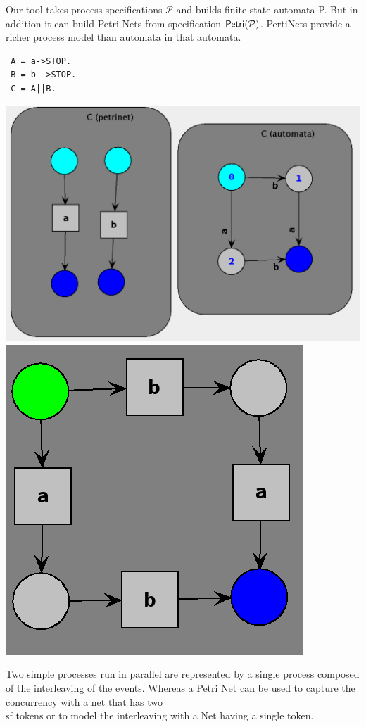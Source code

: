 \documentclass[]{article}
\begin{document}
Our tool takes process specifications $\mathcal{P}$ and builds finite state automata {\sf P}. But in addition it can build Petri Nets from specification ${\sf Petri(\mathcal{P})}$.  PertiNets provide a richer process model than automata in that automata.
\begin{center}\begin{minipage}{0.2\textwidth}
\begin{verbatim}
 A = a->STOP.
 B = b ->STOP.
 C = A||B.
   \end{verbatim}
\end{minipage}\begin{minipage}{0.75\textwidth}
\begin{center}\includegraphics[scale=0.375]{NetsAB.png}
\includegraphics[scale=0.4]{NetInt.png}\end{center}
\end{minipage}
\end{center}
Two simple processes run in parallel are represented by a single process composed of the interleaving of the events. Whereas a Petri Net can be used to capture the concurrency  with a net that has two {\\sf tokens} or to model the  interleaving with a Net having a single token. 
\end{document}
